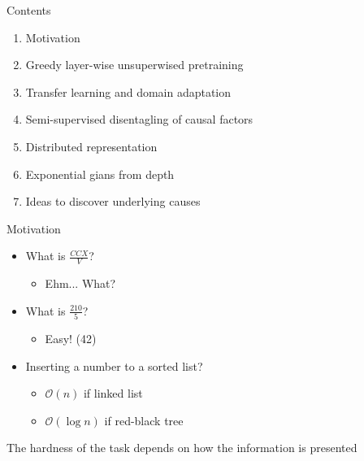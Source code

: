 
\begin{frame}{Contents}
\begin{enumerate}
  \item Motivation
  \item Greedy layer-wise unsuperwised pretraining
  \item Transfer learning and domain adaptation
  \item Semi-supervised disentagling of causal factors
  \item Distributed representation
  \item Exponential gians from depth
  \item Ideas to discover underlying causes
\end{enumerate}
\end{frame}


\begin{frame}{Motivation}
\begin{itemize}
\item What is $\frac{CCX}{V}$?
\begin{itemize}
\item Ehm... What?
\end{itemize}
\item What is $\frac{210}{5}$?
\begin{itemize}
\item Easy! (42)
\end{itemize}
\item Inserting a number to a sorted list?
\begin{itemize}
\item $\mathcal{O}(n)$ if linked list
\item $\mathcal{O}(\log n)$ if red-black tree
\end{itemize}
\end{itemize}
The hardness of the task depends on how the information is presented
\end{frame}

